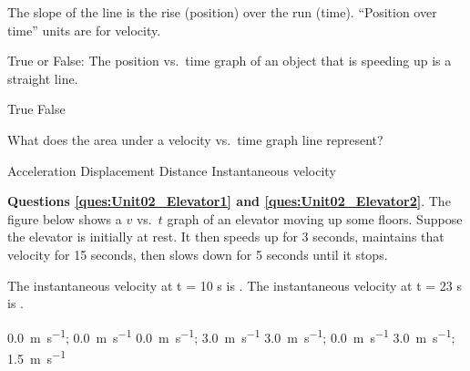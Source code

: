 \documentclass[]{exam}
\begin{document}
\begin{questions}
\begin{solution}
The slope of the line is the rise (position) over the run (time). ``Position over time'' units are for velocity.
\end{solution}


\question
True or False: The position vs.~time graph of an object that is speeding up is a straight line.

\begin{choices}
\choice True
\CorrectChoice False
\end{choices}



\question
What does the area under a velocity vs.~time graph line represent?

\begin{choices}
\choice Acceleration
\CorrectChoice Displacement
\choice Distance
\choice Instantaneous velocity
\end{choices}

\begin{EnvUplevel}
\textbf{Questions \ref{ques:Unit02_Elevator1} and \ref{ques:Unit02_Elevator2}}. The figure below shows a $v$ vs.~$t$ graph of an elevator moving up some floors. Suppose the elevator is initially at rest. It then speeds up for 3 seconds, maintains that velocity for 15 seconds, then slows down for 5 seconds until it stops.
\end{EnvUplevel}

\begin{center}

\label{fig:Unit02_Fig2.20}
\end{center}

\question \label{ques:Unit02_Elevator1}
The instantaneous velocity at t = 10 s is \underline{\hspace{2cm}}. The instantaneous velocity at t = 23 s is \underline{\hspace{2cm}}.

\begin{choices}
\choice \SI[per-mode=symbol]{0.0}{\meter\per\second}; \SI[per-mode=symbol]{0.0}{\meter\per\second}
\choice \SI[per-mode=symbol]{0.0}{\meter\per\second}; \SI[per-mode=symbol]{3.0}{\meter\per\second}
\CorrectChoice \SI[per-mode=symbol]{3.0}{\meter\per\second}; \SI[per-mode=symbol]{0.0}{\meter\per\second}
\choice \SI[per-mode=symbol]{3.0}{\meter\per\second}; \SI[per-mode=symbol]{1.5}{\meter\per\second}
\end{choices}


\end{questions}
\end{document}

